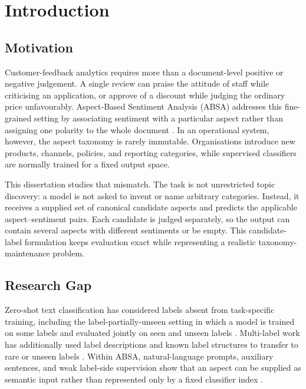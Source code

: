 \chapter{Introduction}

\section{Motivation}

Customer-feedback analytics requires more than a document-level positive or
negative judgement. A single review can praise the attitude of staff while
criticising an application, or approve of a discount while judging the ordinary
price unfavourably. Aspect-Based Sentiment Analysis (ABSA) addresses this
fine-grained setting by associating sentiment with a particular aspect rather
than assigning one polarity to the whole document
\cite{pontiki2016semeval,zhang2023survey}. In an operational system, however,
the aspect taxonomy is rarely immutable. Organisations introduce new products,
channels, policies, and reporting categories, while supervised classifiers are
normally trained for a fixed output space.

This dissertation studies that mismatch. The task is not unrestricted topic
discovery: a model is not asked to invent or name arbitrary categories.
Instead, it receives a supplied set of canonical candidate aspects and predicts
the applicable aspect--sentiment pairs. Each candidate is judged separately, so
the output can contain several aspects with different sentiments or be empty.
This candidate-label formulation keeps evaluation exact while representing a
realistic taxonomy-maintenance problem.

\section{Research Gap}

Zero-shot text classification has considered labels absent from task-specific
training, including the label-partially-unseen setting in which a model is
trained on some labels and evaluated jointly on seen and unseen labels
\cite{yin2019benchmarking}. Multi-label work has additionally used label
descriptions and known label structures to transfer to rare or unseen labels
\cite{rios2018structured,liu2021hierarchy}. Within ABSA, natural-language
prompts, auxiliary sentences, and weak label-side supervision show that an
aspect can be supplied as semantic input rather than represented only by a
fixed classifier index
\cite{sun2019auxiliary,seoh2021open,huang2020weakly}.

